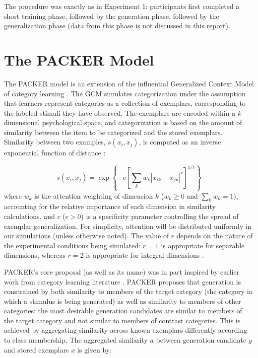 \documentclass[12pt]{article}
\begin{document}
\begin{flushleft}
The procedure was exactly as in Experiment 1: participants first completed a short training phase, followed by the generation phase, followed by the generalization phase (data from this phase is not discussed in this report).












\clearpage

\section{The PACKER Model}

The PACKER model is an extension of the influential Generalized Context Model of category learning \citep[GCM;][]{nosofsky1984choice,nosofsky1986attention}. The GCM simulates categorization under the assumption that learners represent categories as a collection of exemplars, corresponding to the labeled stimuli they have observed. The exemplars are encoded within a $k$-dimensional psychological space, and categorization is based on the amount of similarity between the item to be categorized and the stored exemplars. Similarity between two examples, $s\left(x_i, x_j\right)$, is computed as an inverse exponential function of distance \citep[following][]{shepard1957stimulus,shepard1987toward}:

\begin{equation}
  s\left(x_i,x_j\right) = \exp \left\{ -c \left[\sum_{k}{ w_k \left| x_{ik} - x_{jk} \right|^r }\right]^{1/r} \right\}
  \label{eq:similarity}
\end{equation}
% 
where $w_k$ is the attention weighting of dimension $k$ ($w_k \geq 0$ and $\sum_k{w_k} = 1$), accounting for the relative importance of each dimension in similarity calculations, and $c$ ($c>0$) is a specificity parameter controlling the spread of exemplar generalization. For simplicity, attention will be distributed uniformly in our simulations (unless otherwise noted). The value of $r$ depends on the nature of the experimental conditions being simulated: $r=1$ is appropriate for separable dimensions, whereas $r=2$ is appropriate for integral dimensions \citep[see][]{shepard1964attention,garner1974processing}.


PACKER's core proposal (as well as its name) was in part inspired by earlier work from category learning literature \citep[see][]{hidaka2011packing}. PACKER proposes that generation is constrained by both similarity to members of the target category (the category in which a stimulus is being generated) as well as similarity to members of other categories: the most desirable generation candidates are similar to members of the target category and not similar to members of contrast categories. This is achieved by aggregating similarity across known exemplars differently according to class membership. The aggregated similarity $a$ between generation candidate $y$ and stored exemplars $x$ is given by:


\end{flushleft}
\end{document}
